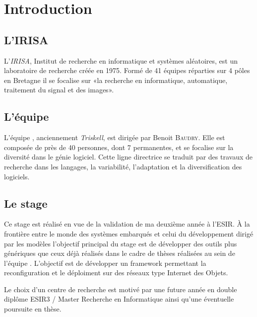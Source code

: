 \section*{Introduction} %
{}

\subsection{L'IRISA}

L'\emph{IRISA}\cite{irisa}, Institut de recherche en informatique et systèmes aléatoires, est un laboratoire de recherche créée en 1975. Formé de 41 équipes réparties sur 4 pôles en Bretagne il se focalise sur «la recherche en informatique, automatique, traitement du signal et des images».

\subsection{L'équipe \diver}

L'équipe \diver\cite{diverse}, anciennement \emph{Triskell}, est dirigée par Benoit \textsc{Baudry}. Elle est composée de près de 40 personnes, dont 7 permanentes, et se focalise sur la diversité dans le génie logiciel. Cette ligne directrice se traduit par des travaux de recherche dans les langages, la variabilité, l'adaptation et la diversification des logiciels.

\subsection{Le stage}
Ce stage est réalisé en vue de la validation de ma deuxième année à l'ESIR. À la frontière entre le monde des systèmes embarqués et celui du développement dirigé par les modèles l'objectif principal du stage est de développer des outils plus génériques que ceux déjà réalisés dans le cadre de thèses réalisées au sein de l'équipe \diver. L'objectif est de développer un framework permettant la reconfiguration et le déploiment sur des réseaux type Internet des Objets.

Le choix d'un centre de recherche est motivé par une future année en double diplôme ESIR3 / Master Recherche en Informatique ainsi qu'une éventuelle poursuite en thèse.